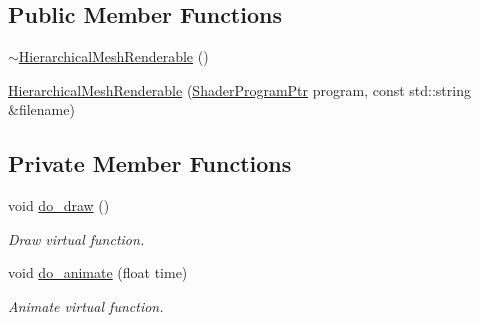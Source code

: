\subsection*{Public Member Functions}
\begin{DoxyCompactItemize}
\item 
\hyperlink{classHierarchicalMeshRenderable_a7fdb59d99bca663e6e89c058a58a8ec7}{$\sim$\+Hierarchical\+Mesh\+Renderable} ()
\item 
\hyperlink{classHierarchicalMeshRenderable_addc544d58fd450811752f821ca2454cb}{Hierarchical\+Mesh\+Renderable} (\hyperlink{ShaderProgram_8hpp_af8e4af1ad4c53875ee5d32ab7e1f4966}{Shader\+Program\+Ptr} program, const std\+::string \&filename)
\end{DoxyCompactItemize}
\subsection*{Private Member Functions}
\begin{DoxyCompactItemize}
\item 
void \hyperlink{classHierarchicalMeshRenderable_a044c9f6688ee58184b8b3e4582f6baa1}{do\+\_\+draw} ()
\begin{DoxyCompactList}\small\item\em Draw virtual function. \end{DoxyCompactList}\item 
void \hyperlink{classHierarchicalMeshRenderable_a291689e73c0d7d2e733c587cd0062747}{do\+\_\+animate} (float time)
\begin{DoxyCompactList}\small\item\em Animate virtual function. \end{DoxyCompactList}\end{DoxyCompactItemize}
